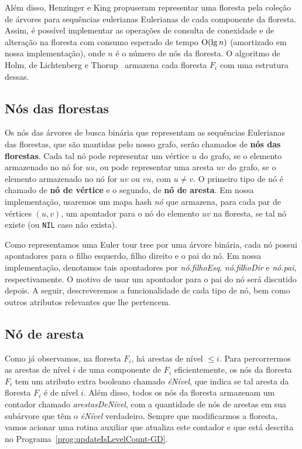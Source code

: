 Além disso, Henzinger e King \cite{henzinger_king} propuseram representar uma floresta pela coleção de árvores para sequências eulerianas Eulerianas de cada componente da floresta. Assim, é possível implementar as operações de consulta de conexidade e de alteração na floresta com consumo esperado de tempo $\mathrm{O}(\lg n)$ (amortizado em nossa implementação), onde $n$ é o número de nós da floresta. O algoritmo de Holm, de Lichtenberg e Thorup~\cite{jacob_holm} armazena cada floresta $F_i$ com uma estrutura dessas.

\subsection{Nós das florestas}
\label{sec:graph-nodes}

Os nós das árvores de busca binária que representam as sequências Eulerianas das florestas, que são mantidas pelo nosso grafo, serão chamados de \textbf{nós das florestas}. Cada tal nó pode representar um vértice $u$ do grafo, se o elemento armazenado no nó for $uu$, ou pode representar uma aresta $uv$ do grafo, se o elemento armazenado no nó for $uv$ ou $vu$, com $u \neq v$. O primeiro tipo de nó é chamado de \textbf{nó de vértice} e o segundo, de \textbf{nó de aresta}. Em nossa implementação, usaremos um mapa hash \textit{nó} que armazena, para cada par de vértices $(u, v)$, um apontador para o nó do elemento $uv$ na floresta, se tal nó existe (ou \texttt{NIL} caso não exista).

Como representamos uma Euler tour tree por uma árvore binária, cada nó possui apontadores para o filho esquerdo, filho direito e o pai do nó. Em nossa implementação, denotamos tais apontadores por \textit{nó.filhoEsq}, \textit{nó.filhoDir} e \textit{nó.pai}, respectivamente. O motivo de usar um apontador para o pai do nó será discutido depois. A seguir, descreveremos a funcionalidade de cada tipo de nó, bem como outros atributos relevantes que lhe pertencem. 

\subsection{Nó de aresta}
\label{sec:node-edge}

Como já observamos, na floresta $F_i$, há arestas de nível $\leq i$. Para percorrermos as arestas de nível $i$ de uma componente de $F_i$ eficientemente, os nós da floresta $F_i$ tem um atributo extra booleano chamado \textit{éNível}, que indica se tal aresta da floresta $F_i$ é de nível $i$. Além disso, todos os nós da floresta armazenam um contador chamado \textit{arestasDeNível}, com a quantidade de nós de arestas em sua subárvore que têm o \textit{éNível} verdadeiro. Sempre que modificarmos a floresta, vamos acionar uma rotina auxiliar que atualiza este contador e que está descrita no Programa~\ref{prog:updateIsLevelCount-GD}.

